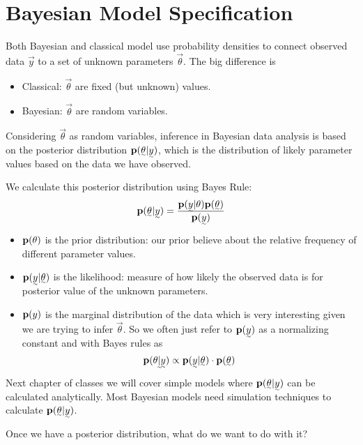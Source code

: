 \section{Bayesian Model Specification}

Both Bayesian and classical model use probability densities to connect observed data $\vec{y}$ to a set of unknown parameters $\vec{\theta}$. The big difference is 
\begin{itemize}
    \item Classical: $\vec{\theta}$ are fixed (but unknown) values.
    \item Bayesian: $\vec{\theta}$ are random variables.
\end{itemize}

Considering $\vec{\theta}$ as random variables, inference in Bayesian data analysis is based on the posterior distribution $\p(\vec{\theta} | \vec{y})$, which is the distribution of likely parameter values based on the data we have observed.

We calculate this posterior distribution using Bayes Rule:
\[
    \p(\vec{\theta}| \vec{y}) = \frac{\p(\vec{y}| \theta) \p(\vec{\theta})}{\p(\vec{y})}
\]

\begin{itemize}
    \item ${\mathbf p}(\theta)$ is the prior distribution: our prior believe about  the relative frequency of different parameter values.
    \item $\p(\vec{y}| \vec{\theta})$ is the likelihood: measure of how likely the observed data is for posterior value of the unknown parameters.
    \item ${\mathbf p}(y)$ is the marginal distribution of the data which is very interesting given we are trying to infer $\vec{\theta}$. So we often just refer to $\p(\vec{y})$ as a normalizing constant and with Bayes rules as
    \[
    \p(\vec{\theta| \vec{y}}) \propto \p(\vec{y}| \vec{\theta}) \cdot \p(\vec{\theta})
    \]
\end{itemize}

Next chapter of classes we will cover simple models where $\p(\vec{\theta}| \vec{y})$ can be calculated analytically. Most Bayesian models need simulation techniques to calculate $\p(\vec{\theta}| \vec{y})$.

Once we have a posterior distribution, what do we want to do with it?

